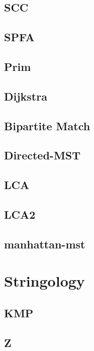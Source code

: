 \documentclass[a4paper,10pt,twocolumn,oneside]{article}
\begin{document}
\subsection{SCC}

\subsection{SPFA}

\subsection{Prim}

\subsection{Dijkstra}

\subsection{Bipartite Match}

\subsection{Directed-MST}

\subsection{LCA}

\subsection{LCA2}

\subsection{manhattan-mst}

\newpage

\section{Stringology}
\subsection{KMP}

\subsection{Z}

\end{document}
